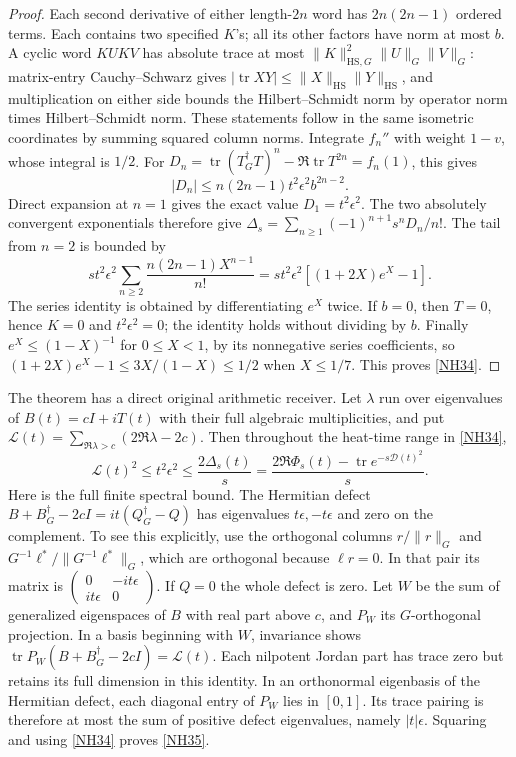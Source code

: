 \documentclass[11pt]{article}
\newcommand{\tr}{\operatorname{tr}}\newcommand{\dd}{\dagger_G}
\newcommand{\eps}{\epsilon}\newcommand{\spec}{\operatorname{spec}}
\begin{document}
\begin{proof}
Each second derivative of either length-\(2n\) word
has \(2n(2n-1)\) ordered terms. Each contains two
specified \(K\)'s; all its other factors have norm at
most \(b\). A cyclic word \(KUKV\) has absolute trace
at most \(\|K\|_{\mathrm{HS},G}^2\|U\|_G\|V\|_G\):
matrix-entry Cauchy--Schwarz gives
\(|\tr XY|\le\|X\|_{\mathrm{HS}}\|Y\|_{\mathrm{HS}}\),
and multiplication on either side bounds the
Hilbert--Schmidt norm by operator norm times
Hilbert--Schmidt norm. These statements follow in the
same isometric coordinates by summing squared column
norms. Integrate \(f_n''\) with weight \(1-v\),
whose integral is \(1/2\). For
\(D_n=\tr(T^\dd T)^n-\Re\tr T^{2n}=f_n(1)\), this gives
\[
|D_n|\le n(2n-1)t^2\eps^2 b^{2n-2}.
\]
Direct expansion at \(n=1\) gives the exact value
\(D_1=t^2\eps^2\).
The two absolutely convergent exponentials therefore give
\(\Delta_s=\sum_{n\ge1}(-1)^{n+1}s^nD_n/n!\).
The tail from \(n=2\) is bounded by
\[
st^2\eps^2
\sum_{n\ge2}\frac{n(2n-1)X^{n-1}}{n!}
=st^2\eps^2[(1+2X)e^X-1].
\]
The series identity is obtained by differentiating
\(e^X\) twice. If \(b=0\), then \(T=0\), hence
\(K=0\) and \(t^2\eps^2=0\); the identity holds without
dividing by \(b\). Finally \(e^X\le(1-X)^{-1}\) for
\(0\le X<1\), by its nonnegative series coefficients,
so \((1+2X)e^X-1\le3X/(1-X)\le1/2\) when
\(X\le1/7\). This proves \eqref{NH34}.
\end{proof}

The theorem has a direct original arithmetic receiver.
Let \(\lambda\) run over eigenvalues of \(B(t)=cI+iT(t)\)
with their full algebraic multiplicities, and put
\(\mathcal L(t)=\sum_{\Re\lambda>c}(2\Re\lambda-2c)\).
Then throughout the heat-time range in \eqref{NH34},
\begin{equation}\tag{NH35}\label{NH35}
\mathcal L(t)^2\le t^2\eps^2
\le\frac{2\Delta_s(t)}s
=\frac{2\Re\Phi_s(t)-\tr e^{-s\mathscr D(t)^2}}s .
\end{equation}
Here is the full finite spectral bound.
The Hermitian defect
\(B+B^\dd-2cI=it(Q^\dd-Q)\) has eigenvalues
\(t\eps,-t\eps\) and zero on the complement.
To see this explicitly, use the orthogonal columns
\(r/\|r\|_G\) and
\(G^{-1}\ell^*/\|G^{-1}\ell^*\|_G\), which are orthogonal
because \(\ell r=0\).
In that pair its matrix is
\(\left(\begin{smallmatrix}0&-it\eps\\it\eps&0\end{smallmatrix}\right)\).
If \(Q=0\) the whole defect is zero.
Let \(W\) be the sum of generalized eigenspaces of \(B\)
with real part above \(c\), and \(P_W\) its
\(G\)-orthogonal projection.
In a basis beginning with \(W\), invariance shows
\(\tr P_W(B+B^\dd-2cI)=\mathcal L(t)\).
Each nilpotent Jordan part has trace zero but retains
its full dimension in this identity.
In an orthonormal eigenbasis of the Hermitian defect,
each diagonal entry of \(P_W\) lies in \([0,1]\).
Its trace pairing is therefore at most the sum of
positive defect eigenvalues, namely \(|t|\eps\).
Squaring and using \eqref{NH34} proves \eqref{NH35}.
\end{document}
